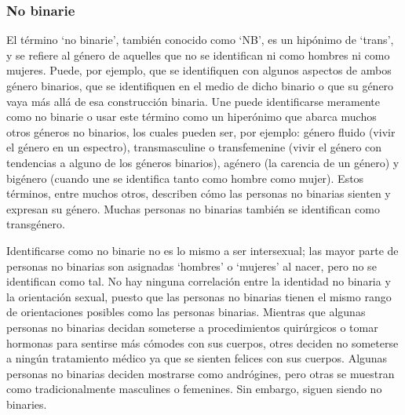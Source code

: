 \documentclass[12pt,openany]{book}
\begin{document}
\subsubsection*{No binarie}

El término `no binarie', también conocido como `NB', es un hipónimo de `trans', y se refiere al género de aquelles que no se identifican ni como hombres ni como mujeres. Puede, por ejemplo, que se identifiquen con algunos aspectos de ambos género binarios, que se identifiquen en el medio de dicho binario o que su género vaya más allá de esa construcción binaria. Une puede identificarse meramente como no binarie o usar este término como un hiperónimo que abarca muchos otros géneros no binarios, los cuales pueden ser, por ejemplo: género fluido (vivir el género en un espectro), transmasculine o transfemenine (vivir el género con tendencias a alguno de los géneros binarios), agénero (la carencia de un género) y bigénero (cuando une se identifica tanto como hombre como mujer). Estos términos, entre muchos otros, describen cómo las personas no binarias sienten y expresan su género. Muchas personas no binarias también se identifican como transgénero.

\newpage
\begin{figure}[h]
    \centering
\end{figure}

Identificarse como no binarie no es lo mismo a ser intersexual; las mayor parte de personas no binarias son asignadas `hombres' o `mujeres' al nacer, pero no se identifican como tal. No hay ninguna correlación entre la identidad no binaria y la orientación sexual, puesto que las personas no binarias tienen el mismo rango de orientaciones posibles como las personas binarias. Mientras que algunas personas no binarias decidan someterse a procedimientos quirúrgicos o tomar hormonas para sentirse más cómodes con sus cuerpos, otres deciden no someterse a ningún tratamiento médico ya que se sienten felices con sus cuerpos. Algunas personas no binarias deciden mostrarse como andrógines, pero otras se muestran como tradicionalmente masculines o femenines. Sin embargo, siguen siendo no binaries.
\end{document}
